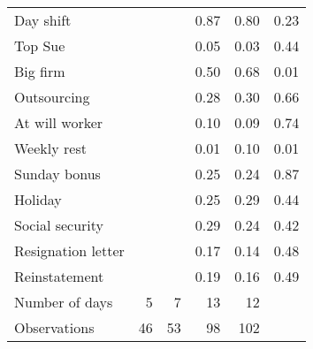 \begin{tabular}{lrrrrc}
Day shift &       &       & 0.87  & 0.80  & \multicolumn{1}{r}{0.23} \\
Top Sue &       &       & 0.05  & 0.03  & \multicolumn{1}{r}{0.44} \\
Big firm &       &       & 0.50  & 0.68  & \multicolumn{1}{r}{0.01} \\
Outsourcing  &       &       & 0.28  & 0.30  & \multicolumn{1}{r}{0.66} \\
At will worker &       &       & 0.10  & 0.09  & \multicolumn{1}{r}{0.74} \\
Weekly rest &       &       & 0.01  & 0.10  & \multicolumn{1}{r}{0.01} \\
Sunday bonus &       &       & 0.25  & 0.24  & \multicolumn{1}{r}{0.87} \\
Holiday &       &       & 0.25  & 0.29  & \multicolumn{1}{r}{0.44} \\
Social security &       &       & 0.29  & 0.24  & \multicolumn{1}{r}{0.42} \\
Resignation letter &       &       & 0.17  & 0.14  & \multicolumn{1}{r}{0.48} \\
Reinstatement &       &       & 0.19  & 0.16  & \multicolumn{1}{r}{0.49} \\
Number of days & 5     & 7     & 13    & 12    &  \\
\midrule
Observations & 46    & 53    & 98    & 102   &  \\
\bottomrule
\bottomrule
\end{tabular}%
